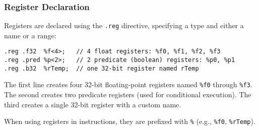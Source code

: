 \subsubsection{Register Declaration}

Registers are declared using the \texttt{.reg} directive, specifying a type and either a name or a range:

\begin{lstlisting}[style=ptx]
.reg .f32  %f<4>;   // 4 float registers: %f0, %f1, %f2, %f3
.reg .pred %p<2>;   // 2 predicate (boolean) registers: %p0, %p1
.reg .b32  %rTemp;  // one 32-bit register named rTemp
\end{lstlisting}

The first line creates four 32-bit floating-point registers named \texttt{\%f0} through \texttt{\%f3}. The second creates two predicate registers (used for conditional execution). The third creates a single 32-bit register with a custom name.

When using registers in instructions, they are prefixed with \texttt{\%} (e.g., \texttt{\%f0}, \texttt{\%rTemp}).

